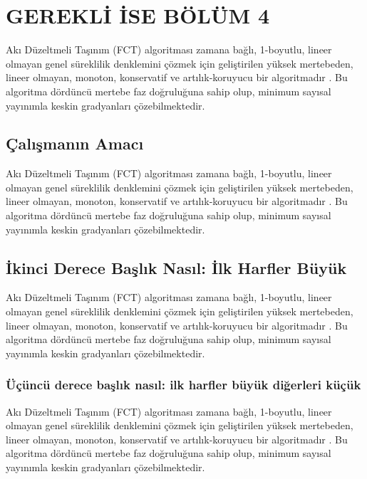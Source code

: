\documentclass[a4paper, 12pt, oneside]{Etuthesis}
\begin{document}
{\begin{landscape}
\end{landscape}

\section{GEREKLİ İSE BÖLÜM 4}

Akı Düzeltmeli Taşınım (FCT) algoritması zamana bağlı, 1-boyutlu, lineer olmayan genel süreklilik denklemini çözmek için geliştirilen yüksek mertebeden, lineer olmayan, monoton, konservatif ve artılık-koruyucu bir algoritmadır . Bu algoritma dördüncü mertebe faz doğruluğuna sahip olup, minimum sayısal yayınımla keskin gradyanları çözebilmektedir.

\subsection{Çalışmanın Amacı}

Akı Düzeltmeli Taşınım (FCT) algoritması zamana bağlı, 1-boyutlu, lineer olmayan genel süreklilik denklemini çözmek için geliştirilen yüksek mertebeden, lineer olmayan, monoton, konservatif ve artılık-koruyucu bir algoritmadır . Bu algoritma dördüncü mertebe faz doğruluğuna sahip olup, minimum sayısal yayınımla keskin gradyanları çözebilmektedir.

\subsection{İkinci Derece Başlık Nasıl: İlk Harfler Büyük}

Akı Düzeltmeli Taşınım (FCT) algoritması zamana bağlı, 1-boyutlu, lineer olmayan genel süreklilik denklemini çözmek için geliştirilen yüksek mertebeden, lineer olmayan, monoton, konservatif ve artılık-koruyucu bir algoritmadır . Bu algoritma dördüncü mertebe faz doğruluğuna sahip olup, minimum sayısal yayınımla keskin gradyanları çözebilmektedir.

\subsubsection{Üçüncü derece başlık nasıl: ilk harfler büyük diğerleri küçük}

Akı Düzeltmeli Taşınım (FCT) algoritması zamana bağlı, 1-boyutlu, lineer olmayan genel süreklilik denklemini çözmek için geliştirilen yüksek mertebeden, lineer olmayan, monoton, konservatif ve artılık-koruyucu bir algoritmadır . Bu algoritma dördüncü mertebe faz doğruluğuna sahip olup, minimum sayısal yayınımla keskin gradyanları çözebilmektedir.

}
\end{document}
